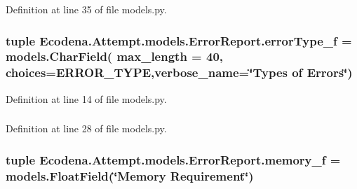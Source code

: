 Definition at line 35 of file models.py.

\hypertarget{class_ecodena_1_1_attempt_1_1models_1_1_error_report_a2206247ced5f221ac3622b203c27d98a}{
\subsubsection[{errorType\_\-f}]{\setlength{\rightskip}{0pt plus 5cm}tuple {\bf Ecodena.Attempt.models.ErrorReport.errorType\_\-f} = models.CharField( max\_\-length = 40, choices={\bf ERROR\_\-TYPE},verbose\_\-name=\char`\"{}Types of Errors\char`\"{})}}
\label{df/d02/class_ecodena_1_1_attempt_1_1models_1_1_error_report_a2206247ced5f221ac3622b203c27d98a}


Definition at line 14 of file models.py.

\hypertarget{class_ecodena_1_1_attempt_1_1models_1_1_error_report_a858275b05dc21b8b755b3b393ad38fb7}{
\subsubsection[{memory\_\-f}]{}}
\label{df/d02/class_ecodena_1_1_attempt_1_1models_1_1_error_report_a858275b05dc21b8b755b3b393ad38fb7}


Definition at line 28 of file models.py.

\hypertarget{class_ecodena_1_1_attempt_1_1models_1_1_error_report_a6251188760c30f622c68f126ba37c765}{
\subsubsection[{memory\_\-f}]{\setlength{\rightskip}{0pt plus 5cm}tuple {\bf Ecodena.Attempt.models.ErrorReport.memory\_\-f} = models.FloatField(\char`\"{}Memory Requirement\char`\"{})}}
\label{df/d02/class_ecodena_1_1_attempt_1_1models_1_1_error_report_a6251188760c30f622c68f126ba37c765}


